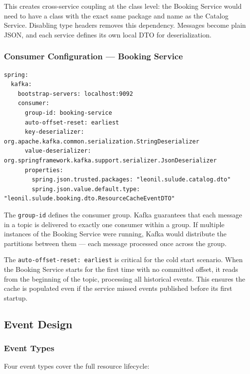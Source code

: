 This creates cross-service coupling at the class level: the Booking Service would need to have a class with the exact same package and name as the Catalog Service. Disabling type headers removes this dependency. Messages become plain JSON, and each service defines its own local DTO for deserialization.

\subsubsection{Consumer Configuration --- Booking Service}

\begin{lstlisting}[style=yamlstyle, caption={Kafka consumer configuration in booking-service application.yaml}]
spring:
  kafka:
    bootstrap-servers: localhost:9092
    consumer:
      group-id: booking-service
      auto-offset-reset: earliest
      key-deserializer: org.apache.kafka.common.serialization.StringDeserializer
      value-deserializer: org.springframework.kafka.support.serializer.JsonDeserializer
      properties:
        spring.json.trusted.packages: "leonil.sulude.catalog.dto"
        spring.json.value.default.type: "leonil.sulude.booking.dto.ResourceCacheEventDTO"
\end{lstlisting}

The \texttt{group-id} defines the consumer group. Kafka guarantees that each message in a topic is delivered to exactly one consumer within a group. If multiple instances of the Booking Service were running, Kafka would distribute the partitions between them --- each message processed once across the group.

The \texttt{auto-offset-reset: earliest} is critical for the cold start scenario. When the Booking Service starts for the first time with no committed offset, it reads from the beginning of the topic, processing all historical events. This ensures the cache is populated even if the service missed events published before its first startup.

\subsection{Event Design}

\subsubsection{Event Types}

Four event types cover the full resource lifecycle:

